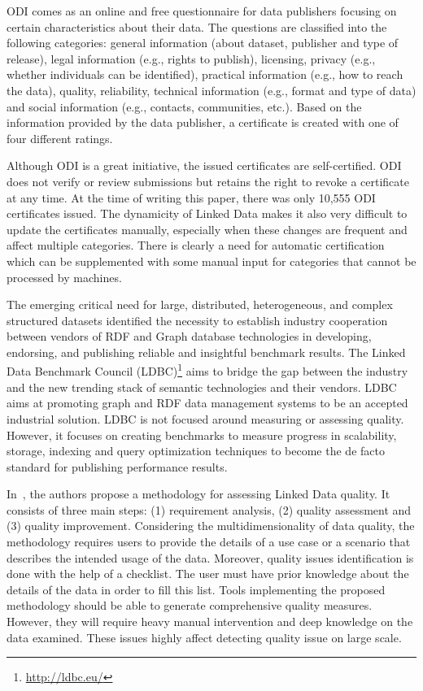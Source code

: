 \documentclass[onecolumn, crcready]{../../Tools/LaTEX/iosart2c}
\begin{document}
ODI comes as an online and free questionnaire for data publishers focusing on certain characteristics about their data. The questions are classified into the following categories: general information (about dataset, publisher and type of release), legal information (e.g., rights to publish), licensing, privacy (e.g., whether individuals can be identified), practical information (e.g., how to reach the data), quality, reliability, technical information (e.g., format and type of data) and social information (e.g., contacts, communities, etc.). Based on the information provided  by the data  publisher, a certificate is created with one of four different ratings.

Although ODI is a great initiative, the issued certificates are self-certified. ODI does not verify or review submissions but retains the right to revoke a certificate at any time. At the time of writing this paper, there was only 10,555 ODI certificates issued. The dynamicity of Linked Data  makes it also very difficult to update the certificates manually, especially when these changes are frequent and affect multiple categories. There is clearly a need for automatic certification which can be supplemented with some manual input for categories that cannot be processed by machines.

The emerging critical need for large, distributed, heterogeneous, and complex structured datasets identified the necessity to establish industry cooperation between vendors of RDF and Graph database technologies in developing, endorsing, and publishing reliable and insightful benchmark results. The Linked Data Benchmark Council (LDBC)\footnote{\url{http://ldbc.eu/}} aims to bridge the gap between the industry and the new trending stack of semantic technologies and their vendors. LDBC aims at promoting graph and RDF data management systems to be an accepted industrial solution. LDBC is not focused around measuring or assessing quality. However, it focuses on creating benchmarks to measure progress in scalability, storage, indexing and query optimization techniques to become the de facto standard for publishing performance results.

In~\cite{Anisa:LDQ:14}, the authors propose a methodology for assessing Linked Data quality. It consists of three main steps: (1) requirement analysis, (2) quality assessment and (3) quality improvement. Considering the multidimensionality of data quality, the methodology requires users to provide the details of a use case or a scenario that describes the intended usage of the data. Moreover, quality issues identification is done with the help of a checklist. The user must have prior knowledge about the details of the data in order to fill this list. Tools implementing the proposed methodology should be able to generate comprehensive quality measures. However, they will require heavy manual intervention and deep knowledge on the data examined. These issues highly affect detecting quality issue on large scale.
\end{document}
